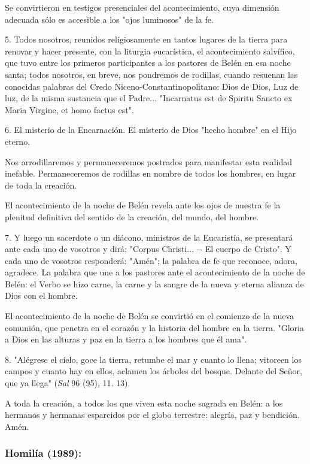 Se convirtieron en testigos presenciales del acontecimiento, cuya
dimensión adecuada sólo es accesible a los "ojos luminosos" de la fe.

5. Todos nosotros, reunidos religiosamente en tantos lugares de la
tierra para renovar y hacer presente, con la liturgia eucarística, el
acontecimiento salvífico, que tuvo entre los primeros participantes a
los pastores de Belén en esa noche santa; todos nosotros, en breve, nos
pondremos de rodillas, cuando resuenan las conocidas palabras del Credo
Niceno-Constantinopolitano: Dios de Dios, Luz de luz, de la misma
sustancia que el Padre... "Incarnatus est de Spiritu Sancto ex Maria
Virgine, et homo factus est".

6. El misterio de la Encarnación. El misterio de Dios "hecho hombre" en
el Hijo eterno.

Nos arrodillaremos y permaneceremos postrados para manifestar esta
realidad inefable. Permaneceremos de rodillas en nombre de todos los
hombres, en lugar de toda la creación.

El acontecimiento de la noche de Belén revela ante los ojos de nuestra
fe la plenitud definitiva del sentido de la creación, del mundo, del
hombre.

7. Y luego un sacerdote o un diácono, ministros de la Eucaristía, se
presentará ante cada uno de vosotros y dirá: "Corpus Christi... -\/- El
cuerpo de Cristo". Y cada uno de vosotros responderá: "Amén"; la palabra
de fe que reconoce, adora, agradece. La palabra que une a los pastores
ante el acontecimiento de la noche de Belén: el Verbo se hizo carne, la
carne y la sangre de la nueva y eterna alianza de Dios con el hombre.

El acontecimiento de la noche de Belén se convirtió en el comienzo de la
nueva comunión, que penetra en el corazón y la historia del hombre en la
tierra. "Gloria a Dios en las alturas y paz en la tierra a los hombres
que él ama".

8. "Alégrese el cielo, goce la tierra, retumbe el mar y cuanto lo llena;
vitoreen los campos y cuanto hay en ellos, aclamen los árboles del
bosque. Delante del Señor, que ya llega" (\emph{Sal} 96 (95), 11. 13).

A toda la creación, a todos los que viven esta noche sagrada en Belén: a
los hermanos y hermanas esparcidos por el globo terrestre: alegría, paz
y bendición. Amén.

\subsubsection{Homilía (1989): }

